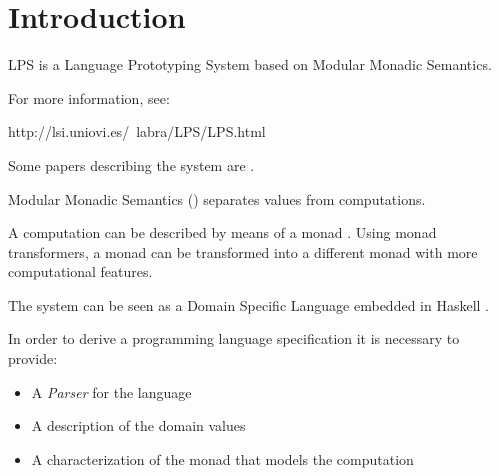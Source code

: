 \chapter{Introduction}

LPS is a Language Prototyping System based on 
Modular Monadic Semantics.

For more information, see: 

http://lsi.uniovi.es/~labra/LPS/LPS.html

Some papers describing the system are \cite{Labra98, Labra99}.


Modular Monadic Semantics (\cite{LiangHudakJones95, LiangHudak96}) 
separates values from computations. 

A computation can be described by means of a monad \cite{Moggi89}. Using monad 
transformers, a monad can be transformed into a different monad with
more computational features.

The system can be seen as a Domain Specific Language embedded in
Haskell \cite{Haskell98}.

In order to derive a programming language specification it is
necessary to provide:

\begin{itemize}
\item A \emph{Parser} for the language
\item A description of the domain values 
\item A characterization of the monad that models the 
	computation
\end{itemize}


